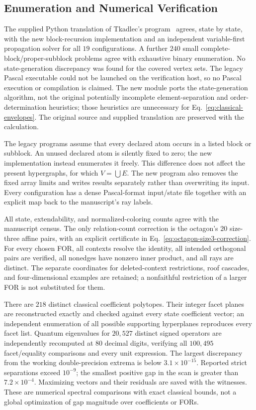 \documentclass[aps,pra,reprint,superscriptaddress,longbibliography,nofootinbib,floatfix,10pt]{revtex4-2}
\theoremstyle{definition}\newtheorem{definition}[theorem]{Definition}
\theoremstyle{remark}\newtheorem{remark}[theorem]{Remark}
\begin{document}
\subsection{Enumeration and Numerical Verification}

The supplied Python translation of Tkadlec's program~\cite{tkadlec-2states} agrees, state by state, with the new block-recursion implementation and an independent variable-first propagation solver for all $19$ configurations. A further $240$ small complete-block/proper-subblock problems agree with exhaustive binary enumeration. No state-generation discrepancy was found for the covered vertex sets. The legacy Pascal executable could not be launched on the verification host, so no Pascal execution or compilation is claimed. The new module ports the state-generation algorithm, not the original potentially incomplete element-separation and order-determination heuristics; those heuristics are unnecessary for Eq.~\eqref{eq:classical-envelopes}. The original source and supplied translation are preserved with the calculation.

The legacy programs assume that every declared atom occurs in a listed block or subblock. An unused declared atom is silently fixed to zero; the new implementation instead enumerates it freely. This difference does not affect the present hypergraphs, for which $V=\bigcup E$. The new program also removes the fixed array limits and writes results separately rather than overwriting its input. Every configuration has a dense Pascal-format input/state file together with an explicit map back to the manuscript's ray labels.

All state, extendability, and normalized-coloring counts agree with the manuscript census. The only relation-count correction is the octagon's $20$ size-three affine pairs, with an explicit certificate in Eq.~\eqref{eq:octagon-size3-correction}. For every chosen FOR, all contexts resolve the identity, all intended orthogonal pairs are verified, all nonedges have nonzero inner product, and all rays are distinct. The separate coordinates for deleted-context restrictions, roof cascades, and four-dimensional examples are retained; a nonfaithful restriction of a larger FOR is not substituted for them.

There are $218$ distinct classical coefficient polytopes. Their integer facet planes are reconstructed exactly and checked against every state coefficient vector; an independent enumeration of all possible supporting hyperplanes reproduces every facet list. Quantum eigenvalues for $20{,}527$ distinct signed operators are independently recomputed at $80$ decimal digits, verifying all $100{,}495$ facet/equality comparisons and every unit expression. The largest discrepancy from the working double-precision extrema is below $3.1\times10^{-15}$. Reported strict separations exceed $10^{-9}$; the smallest positive gap in the scan is greater than $7.2\times10^{-4}$. Maximizing vectors and their residuals are saved with the witnesses. These are numerical spectral comparisons with exact classical bounds, not a global optimization of gap magnitude over coefficients or FORs.
\end{document}
